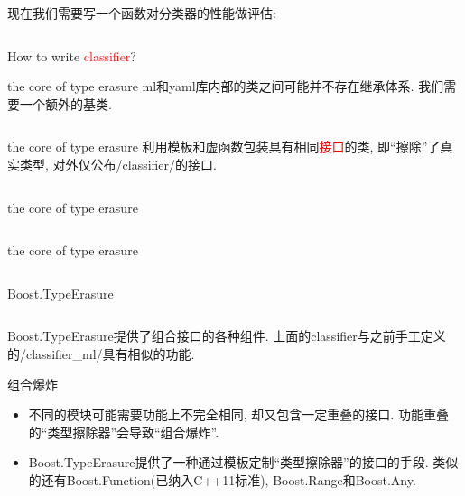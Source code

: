 \documentclass[compress]{beamer}
\begin{document}
\begin{frame}
    现在我们需要写一个函数对分类器的性能做评估:

    \vspace{1em}

    \inputminted[fontsize=\footnotesize]{cpp}{core_fwd.hpp}
\end{frame}

\begin{frame}
    \begin{center}
        How to write \textcolor{red}{classifier}?
    \end{center}
\end{frame}

\begin{frame}{the core of type erasure}
    ml和yaml库内部的类之间可能并不存在继承体系. 我们需要一个额外的基类.

    \vspace{1em}

    \inputminted[fontsize=\footnotesize]{cpp}{clf.hpp}
\end{frame}

\begin{frame}{the core of type erasure}
    利用模板和虚函数包装具有相同\textcolor{red}{接口}的类, 即``擦除''了真实类型, 对外仅公布/classifier/的接口.

    \vspace{1em}

    \inputminted[fontsize=\footnotesize]{cpp}{clf_ml.hpp}
\end{frame}

\begin{frame}{the core of type erasure}
    \inputminted[fontsize=\footnotesize]{cpp}{clf_yaml.hpp}
\end{frame}

\begin{frame}{the core of type erasure}
    \inputminted[fontsize=\footnotesize]{cpp}{use_core_te.hpp}
\end{frame}

\begin{frame}{Boost.TypeErasure}
    \inputminted[fontsize=\footnotesize]{cpp}{boost_te.hpp}
    \vskip5mm
    Boost.TypeErasure提供了组合接口的各种组件. 上面的classifier与之前手工定义的/classifier_ml/具有相似的功能.
\end{frame}

\begin{frame}{组合爆炸}
    \begin{itemize}[<+->]
        \item 不同的模块可能需要功能上不完全相同, 却又包含一定重叠的接口. 功能重叠的``类型擦除器''会导致``组合爆炸''.
        \item Boost.TypeErasure提供了一种通过模板定制``类型擦除器''的接口的手段. 类似的还有Boost.Function(已纳入C++11标准), Boost.Range和Boost.Any.
    \end{itemize}
\end{frame}
\end{document}
